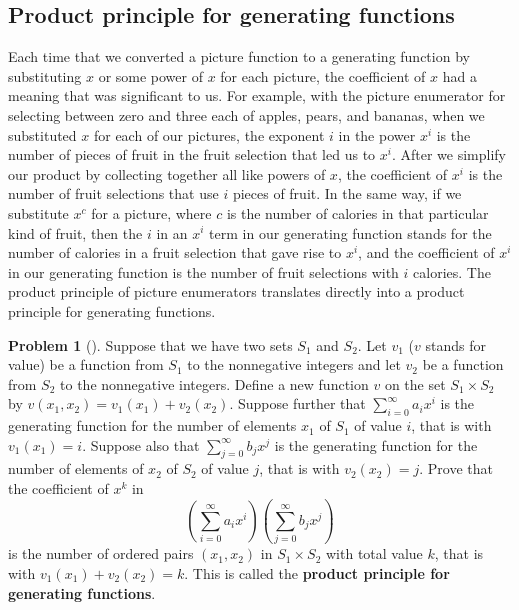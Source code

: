 \documentclass[10pt,]{book}
\newcommand{\terminology}[1]{\textbf{#1}}
\theoremstyle{plain}
\theoremstyle{definition}
\newtheorem{activity}[project]{Problem}
\theoremstyle{definition}
\numberwithin{equation}{chapter}
\begin{document}
\subsection[{Product principle for generating functions}]{Product principle for generating functions}\label{subsection-44}
Each time that we converted a picture function to a generating function by substituting \(x\) or some power of \(x\) for each picture, the coefficient of \(x\) had a meaning that was significant to us. For example, with the picture enumerator for selecting between zero and three each of apples, pears, and bananas, when we substituted \(x\) for each of our pictures, the exponent \(i\) in the power \(x^i\) is the number of pieces of fruit in the fruit selection that led us to \(x^i\). After we simplify our product by collecting together all like powers of \(x\), the coefficient of \(x^i\) is the number of fruit selections that use \(i\) pieces of fruit. In the same way, if we substitute \(x^c\) for a picture, where \(c\) is the number of calories in that particular kind of fruit, then the \(i\) in an \(x^i\) term in our generating function stands for the number of calories in a fruit selection that gave rise to \(x^i\), and the coefficient of \(x^i\) in our generating function is the number of fruit selections with \(i\) calories.  The product principle of picture enumerators translates directly into a product principle for generating functions.%
\begin{activity}[] \label{ProductPrincipleOGF}
Suppose that we have two sets \(S_1\) and \(S_2\). Let \(v_1\) (\(v\) stands for value) be a function from \(S_1\) to the nonnegative integers and let \(v_2\) be a function from \(S_2\) to the nonnegative integers.  Define a new function \(v\) on the set \(S_1 \times S_2\) by \(v(x_1,x_2) = v_1(x_1) +v_2(x_2)\). Suppose further that \(\sum_{i=0}^\infty a_ix^i\) is the generating function for the number of elements \(x_1\) of \(S_1\) of value \(i\), that is with \(v_1(x_1)=i\). Suppose also that \(\sum_{j=0}^\infty b_j x^j\) is the generating function for the number of elements of \(x_2\) of \(S_2\) of value \(j\), that is with \(v_2(x_2) = j\).  Prove that the coefficient of \(x^k\) in%
\begin{equation*}
\left(\sum_{i=0}^\infty a_ix^i\right)\left(\sum_{j=0}^\infty
b_jx^j\right)
\end{equation*}
is the number of ordered pairs \((x_1,x_2)\) in \(S_1\times S_2\) with total value \(k\), that is with \(v_1(x_1) +v_2(x_2) =k\). This is called the \terminology{product principle for generating functions}.%
\end{activity}
\end{document}
